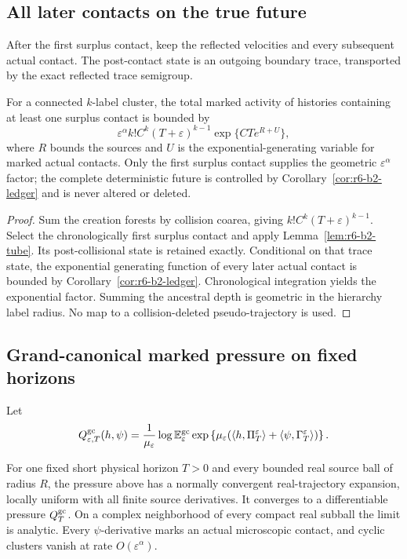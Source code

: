 \subsection{All later contacts on the true future}

After the first surplus contact, keep the reflected velocities and every
subsequent actual contact.  The post-contact state is an outgoing boundary
trace, transported by the exact reflected trace semigroup.

\begin{theorem}
\label{thm:r6-b2-cyclic}
For a connected \(k\)-label cluster, the total marked activity of histories
containing at least one surplus contact is bounded by
\[
\varepsilon^\alpha k!C^k(T+\varepsilon)^{k-1}
\exp\{CTe^{R+U}\},
\]
where \(R\) bounds the sources and \(U\) is the exponential-generating
variable for marked actual contacts.  Only the first surplus contact supplies
the geometric \(\varepsilon^\alpha\) factor; the complete deterministic future
is controlled by Corollary~\ref{cor:r6-b2-ledger} and is never altered or
deleted.
\end{theorem}

\begin{proof}
Sum the creation forests by collision coarea, giving
\(k!C^k(T+\varepsilon)^{k-1}\).  Select the chronologically first surplus
contact and apply Lemma~\ref{lem:r6-b2-tube}.  Its post-collisional state is
retained exactly.  Conditional on that trace state, the exponential generating
function of every later actual contact is bounded by
Corollary~\ref{cor:r6-b2-ledger}.  Chronological integration yields the
exponential factor.  Summing the ancestral depth is geometric in the hierarchy
label radius.  No map to a collision-deleted pseudo-trajectory is used.
\end{proof}

\subsection{Grand-canonical marked pressure on fixed horizons}

Let
\[
Q_{\varepsilon,T}^{\rm gc}(h,\psi)=
\frac1{\mu_\varepsilon}\log
\mathbb E_\varepsilon^{\rm gc}
\exp\left\{
\mu_\varepsilon
(\langle h,\Pi_T^\varepsilon\rangle+
 \langle\psi,\Gamma_T^\varepsilon\rangle)
\right\}.
\]

\begin{theorem}
\label{thm:r6-b2-pressure}
For one fixed short physical horizon \(T>0\) and every bounded real source
ball of radius \(R\), the pressure above has a normally convergent
real-trajectory expansion, locally uniform with all finite source derivatives.
It converges to a differentiable pressure \(Q_T^{\rm gc}\).  On a complex
neighborhood of every compact real subball the limit is analytic.  Every
\(\psi\)-derivative marks an actual microscopic contact, and cyclic clusters
vanish at rate \(O(\varepsilon^\alpha)\).
\end{theorem}

